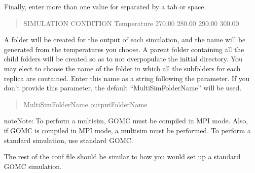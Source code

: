 \documentclass[letterpaper,10pt,english]{sphinxmanual}
\begin{document}
Finally, enter more than one value for  separated by a tab or space.
\begin{quote}

\begin{sphinxVerbatim}[commandchars=\\\{\}]
\PYGZsh{}\PYGZsh{}\PYGZsh{}\PYGZsh{}\PYGZsh{}\PYGZsh{}\PYGZsh{}\PYGZsh{}\PYGZsh{}\PYGZsh{}\PYGZsh{}\PYGZsh{}\PYGZsh{}\PYGZsh{}\PYGZsh{}\PYGZsh{}\PYGZsh{}\PYGZsh{}\PYGZsh{}\PYGZsh{}\PYGZsh{}\PYGZsh{}\PYGZsh{}\PYGZsh{}\PYGZsh{}\PYGZsh{}\PYGZsh{}\PYGZsh{}\PYGZsh{}\PYGZsh{}\PYGZsh{}\PYGZsh{}\PYGZsh{}
\PYGZsh{} SIMULATION CONDITION
\PYGZsh{}\PYGZsh{}\PYGZsh{}\PYGZsh{}\PYGZsh{}\PYGZsh{}\PYGZsh{}\PYGZsh{}\PYGZsh{}\PYGZsh{}\PYGZsh{}\PYGZsh{}\PYGZsh{}\PYGZsh{}\PYGZsh{}\PYGZsh{}\PYGZsh{}\PYGZsh{}\PYGZsh{}\PYGZsh{}\PYGZsh{}\PYGZsh{}\PYGZsh{}\PYGZsh{}\PYGZsh{}\PYGZsh{}\PYGZsh{}\PYGZsh{}\PYGZsh{}\PYGZsh{}\PYGZsh{}\PYGZsh{}\PYGZsh{}
Temperature   270.00    280.00    290.00    300.00
\end{sphinxVerbatim}
\end{quote}

A folder will be created for the output of each simulation, and the name will be generated from the temperatures you choose.
A parent folder containing all the child folders will be created so as to not overpopulate the initial directory.
You may elect to choose the name of the folder in which all the sub\sphinxhyphen{}folders for each replica are contained.
Enter this name as a string following the  parameter.  If you don’t provide this parameter, the default “MultiSimFolderName” will be used.
\begin{quote}

\begin{sphinxVerbatim}[commandchars=\\\{\}]
MultiSimFolderName  outputFolderName
\end{sphinxVerbatim}
\end{quote}

\begin{sphinxadmonition}{note}{Note:}
To perform a multisim, GOMC must be compiled in MPI mode.  Also, if GOMC is compiled in MPI mode, a multisim must be performed.  To perform a standard simulation, use standard GOMC.
\end{sphinxadmonition}

The rest of the conf file should be similar to how you would set up a standard GOMC simulation.
\end{document}
